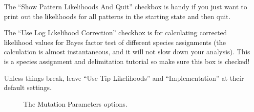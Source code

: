 {{    The ``Show Pattern Likelihoods And Quit'' checkbox is handy if you just want to print out the likelihoods for all patterns in the starting state and then quit.
    
    The ``Use Log Likelihood Correction'' checkbox is for calculating corrected likelihood values for Bayes factor test of different species assignments (the calculation is almost instantaneous, and it will not slow down your analysis).
    This is a species assignment and delimitation tutorial so make sure this box is checked!

    Unless things break, leave ``Use Tip Likelihoods'' and ``Implementation'' at their default settings.

    }
    
        \begin{figure}[htbp]
        \centering
        \caption{The Mutation Parameters options.}
        \label{fig:beauti-mutation}
    \end{figure}
}

